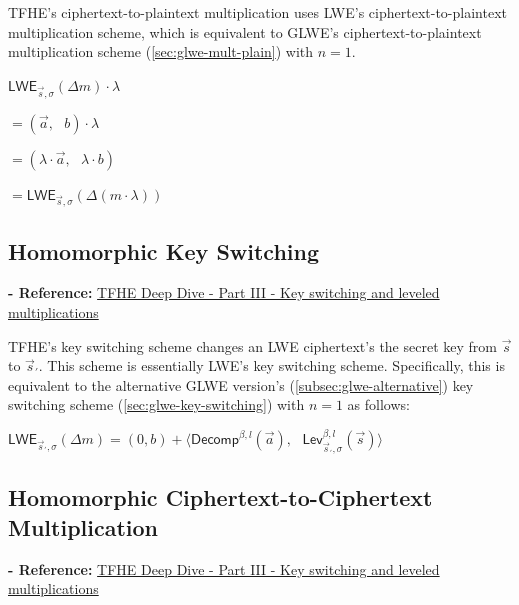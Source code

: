 TFHE's ciphertext-to-plaintext multiplication uses LWE's ciphertext-to-plaintext multiplication scheme, which is equivalent to GLWE's ciphertext-to-plaintext multiplication scheme (\autoref{sec:glwe-mult-plain}) with $n = 1$.  

\begin{tcolorbox}[title={\textbf{\tboxlabel{\ref*{subsec:tfhe-mult-plain}} TFHE Ciphertext-to-Plaintext Multiplication}}]
$\textsf{LWE}_{\vec{s}, \sigma}(\Delta m) \cdot \lambda$

$= (\vec{a}, \text{ } b) \cdot \lambda$

$= (\lambda\cdot \vec{a}, \text{ } \lambda \cdot b)$

$= \textsf{LWE}_{\vec{s}, \sigma}(\Delta (m \cdot \lambda) )$
\end{tcolorbox}


\subsection{Homomorphic Key Switching}
\label{subsec:tfhe-key-switching}

\textbf{- Reference:} 
\href{https://www.zama.ai/post/tfhe-deep-dive-part-3}{TFHE Deep Dive - Part III - Key switching and leveled multiplications}~\cite{tfhe-3}

TFHE's key switching scheme changes an LWE ciphertext's the secret key from $\vec{s}$ to $\vec{s}_{'}$. This scheme is essentially LWE's key switching scheme. Specifically, this is equivalent to the alternative GLWE version's (\autoref{subsec:glwe-alternative}) key switching scheme (\autoref{sec:glwe-key-switching}) with $n = 1$ as follows:

\begin{tcolorbox}[title={\textbf{\tboxlabel{\ref*{subsec:tfhe-key-switching}} TFHE Key Switching}}]
$\textsf{LWE}_{\vec{s}_{'},\sigma}(\Delta m) = (0, b) + \bm{\langle} \textsf{Decomp}^{\beta, l}(\vec{a}), \text{ } \textsf{Lev}_{\vec{s}_{'}, \sigma}^{\beta, l}(\vec{s}) \bm{\rangle}$
\end{tcolorbox}


\subsection{Homomorphic Ciphertext-to-Ciphertext Multiplication}
\label{subsec:tfhe-mult-cipher}

\textbf{- Reference:} 
\href{https://www.zama.ai/post/tfhe-deep-dive-part-3}{TFHE Deep Dive - Part III - Key switching and leveled multiplications}~\cite{tfhe-3}

